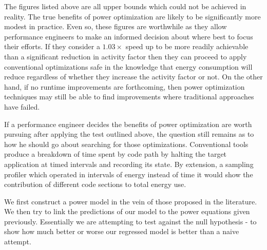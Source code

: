 The figures listed above are all upper bounds which could not be achieved in reality. The true benefits of power optimization are likely to be significantly more modest in practice. Even so, these figures are worthwhile as they allow performance engineers to make an informed decision about where best to focus their efforts. If they consider a $1.03 \times$ speed up to be more readily achievable than a significant reduction in activity factor then they can proceed to apply conventional optimizations safe in the knowledge that energy consumption will reduce regardless of whether they increase the activity factor or not. On the other hand, if no runtime improvements are forthcoming, then power optimization techniques may still be able to find improvements where traditional approaches have failed.


If a performance engineer decides the benefits of power optimization are worth pursuing after applying the test outlined above, the question still remains as to how he should go about searching for those optimizations. Conventional tools produce a breakdown of time spent by code path by halting the target application at timed intervals and recording its state. By extension, a sampling profiler which operated in intervals of energy instead of time it would show the contribution of different code sections to total energy use.

We first construct a power model in the vein of those proposed in the literature. We then try to link the predictions of our model to the power equations given previously. Essentially we are attempting to test against the null hypothesis - to show how much better or worse our regressed model is better than a naive attempt.





